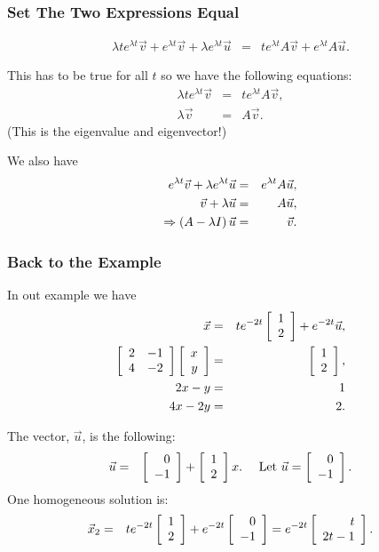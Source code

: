 \begin{frame}
  \frametitle{Set The Two Expressions Equal}

    \begin{eqnarray*}
      \lambda t e^{\lambda t} \vec{v} + e^{\lambda t} \vec{v} + \lambda e^{\lambda t} \vec{u}
      & = & 
      t e^{\lambda t} A \vec{v} + e^{\lambda t} A \vec{u}.
    \end{eqnarray*}
  
    This has to be true for all $t$ so we have the following equations:
    \begin{eqnarray*}
      \lambda t e^{\lambda t} \vec{v} & = & t e^{\lambda t} A \vec{v}, \\
      \lambda \vec{v} & = & A \vec{v}.
    \end{eqnarray*}
    (This is the eigenvalue and eigenvector!)

    We also have 
    \begin{eqnarray*}
      e^{\lambda t} \vec{v} + \lambda e^{\lambda t} \vec{u} & = & e^{\lambda t} A \vec{u}, \\
      \vec{v} + \lambda \vec{u} & = &  A \vec{u}, \\
      \Rightarrow \left( A - \lambda I \right) \vec{u} & = & \vec{v}.
    \end{eqnarray*}

\end{frame}

\begin{frame}
  \frametitle{Back to the Example}

  In out example we have
  \begin{eqnarray*}
    \vec{x} & = & t e^{-2 t} \left[ \begin{array}{r} 1 \\ 2 \end{array} \right] + e^{-2 t} \vec{u}, \\
    \left[ \begin{array}{rr} 2 & -1 \\ 4 & -2 \end{array} \right] \left[ \begin{array}{r} x \\ y \end{array} \right] & = & \left[ \begin{array}{r} 1 \\ 2 \end{array} \right], \\
    2x-y & = & 1 \\
    4x-2y & = & 2.
  \end{eqnarray*}

  The vector, $\vec{u}$, is the following:
  \begin{eqnarray*}
    \vec{u} & = & \left[ \begin{array}{r} 0 \\ -1 \end{array} \right]+\left[ \begin{array}{r} 1 \\ 2 \end{array} \right]x. 
  ~~~~\text{Let }  \vec{u}  =  \left[ \begin{array}{r} 0 \\ -1 \end{array} \right].
  \end{eqnarray*}
  One homogeneous solution is:
  \begin{eqnarray*}
    \vec{x}_2 & = & te^{-2t}\left[ \begin{array}{r} 1 \\ 2 \end{array} \right]+e^{-2t}\left[ \begin{array}{r} 0 \\ -1 \end{array} \right] 
     =  e^{-2t}\left[ \begin{array}{r} t \\ 2t-1 \end{array} \right].
  \end{eqnarray*}

\end{frame}

